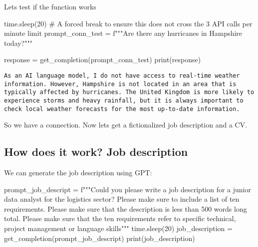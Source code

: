 \documentclass[
  letterpaper,
  DIV=11,
  numbers=noendperiod]{scrartcl}
\newenvironment{Shaded}{\begin{snugshade}}{\end{snugshade}}
\newcommand{\BuiltInTok}[1]{\textcolor[rgb]{0.00,0.23,0.31}{#1}}
\newcommand{\CommentTok}[1]{\textcolor[rgb]{0.37,0.37,0.37}{#1}}
\newcommand{\DecValTok}[1]{\textcolor[rgb]{0.68,0.00,0.00}{#1}}
\newcommand{\NormalTok}[1]{\textcolor[rgb]{0.00,0.23,0.31}{#1}}
\newcommand{\OperatorTok}[1]{\textcolor[rgb]{0.37,0.37,0.37}{#1}}
\newcommand{\SpecialStringTok}[1]{\textcolor[rgb]{0.13,0.47,0.30}{#1}}
\begin{document}
Lets test if the function works

\begin{Shaded}
\begin{Highlighting}[]
\NormalTok{time.sleep(}\DecValTok{20}\NormalTok{) }\CommentTok{\# A forced break to ensure this does not cross the 3 API calls per minute limit}
\NormalTok{prompt\_conn\_test }\OperatorTok{=} \SpecialStringTok{f"""Are there any hurricanes in Hampshire today?"""}

\NormalTok{response }\OperatorTok{=}\NormalTok{ get\_completion(prompt\_conn\_test)}
\BuiltInTok{print}\NormalTok{(response)}
\end{Highlighting}
\end{Shaded}

\begin{verbatim}
As an AI language model, I do not have access to real-time weather information. However, Hampshire is not located in an area that is typically affected by hurricanes. The United Kingdom is more likely to experience storms and heavy rainfall, but it is always important to check local weather forecasts for the most up-to-date information.
\end{verbatim}

So we have a connection. Now lets get a fictionalized job description
and a CV.

\hypertarget{how-does-it-work-job-description}{%
\subsection{How does it work? Job
description}\label{how-does-it-work-job-description}}

We can generate the job description using GPT:

\begin{Shaded}
\begin{Highlighting}[]
\NormalTok{prompt\_job\_descript }\OperatorTok{=} \SpecialStringTok{f"""Could you please write a job description for a junior data analyst for the logistics sector? Please make sure to include a list of ten requirements. Please make sure that the description is less than 500 words long total. Please make sure that the ten requirements refer to specific technical, project management or language skills"""}
\NormalTok{time.sleep(}\DecValTok{20}\NormalTok{)}
\NormalTok{job\_description }\OperatorTok{=}\NormalTok{ get\_completion(prompt\_job\_descript)}
\BuiltInTok{print}\NormalTok{(job\_description)}
\end{Highlighting}
\end{Shaded}
\end{document}
